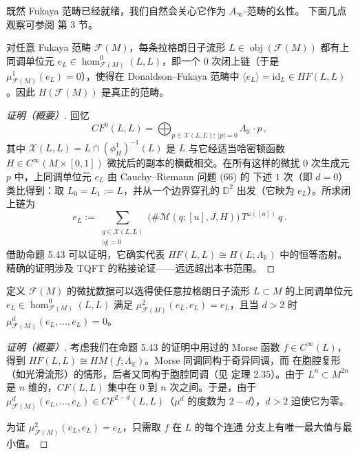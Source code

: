 
既然 Fukaya 范畴已经就绪，我们自然会关心它作为 $A_\infty$-范畴的幺性。
下面几点观察可参阅 \cite{AS09} 第 3 节。

\begin{Lem}\label{lem:6.16}
对任意 Fukaya 范畴 $\mathcal F(M)$，每条拉格朗日子流形
$L\in\operatorname{obj}(\mathcal F(M))$ 都有上同调单位元
$e_L\in\hom^0_{\mathcal F(M)}(L,L)$，即一个 $0$ 次闭上链（于是
$\mu^1_{\mathcal F(M)}(e_L)=0$），使得在 Donaldson--Fukaya 范畴中
$\langle e_L\rangle=\mathrm{id}_L\in HF(L,L)$。因此 $H(\mathcal F(M))$
是真正的范畴。
\end{Lem}

\begin{proof}[证明（概要）]
回忆
\[
CF^0(L,L)=\bigoplus_{p\in\mathcal X(L,L):\ |p|=0}\Lambda_{\mathbb K}\cdot p\,,
\]
其中 $\mathcal X(L,L)=L\cap(\phi^1_H)^{-1}(L)$ 是 $L$ 与它经适当哈密顿函数
$H\in C^\infty(M\times[0,1])$ 微扰后的副本的横截相交。在所有这样的微扰
$0$ 次生成元 $p$ 中，上同调单位元 $e_L$ 由 Cauchy--Riemann 问题 (66) 的
下述 $1$ 次（即 $d=0$）类比得到：取 $L_0=L_1:=L$，并从一个边界穿孔的
$\mathbb D^2$ 出发（它映为 $e_L$）。所求闭上链为
\begin{equation}
e_L:=\sum_{\substack{q\in\mathcal X(L,L)\\ |q|=0}}
\bigl(\#\mathcal M(q;[u],J,H)\bigr)\,T^{\omega([u])}\,q\,.
\label{eq:6.87}
\end{equation}
借助命题 5.43 可以证明，它确实代表 $HF(L,L)\cong H(L;\Lambda_{\mathbb K})$
中的恒等态射。精确的证明涉及 TQFT 的粘接论证——远远超出本书范围。
\end{proof}


\begin{Lem}\label{lem:6.17}
定义 $\mathcal F(M)$ 的微扰数据可以选得使任意拉格朗日子流形
$L\subset M$ 的上同调单位元 $e_L\in\hom^0_{\mathcal F(M)}(L,L)$ 满足
$\mu^2_{\mathcal F(M)}(e_L,e_L)=e_L$，且当 $d>2$ 时
$\mu^d_{\mathcal F(M)}(e_L,\dots,e_L)=0$。
\end{Lem}

\begin{proof}[证明（概要）]
考虑我们在命题 5.43 的证明中用过的 Morse 函数 $f\in C^\infty(L)$，得到
$HF(L,L)\cong HM(f;\Lambda_{\mathbb K})$。Morse 同调同构于奇异同调，而
在胞腔复形（如光滑流形）的情形，后者又同构于胞腔同调（见 \cite{Hat09}
定理 2.35）。由于 $L^n\subset M^{2n}$ 是 $n$ 维的，$CF(L,L)$
集中在 $0$ 到 $n$ 次之间。于是，由于
$\mu^d_{\mathcal F(M)}(e_L,\dots,e_L)\in CF^{2-d}(L,L)$（$\mu^d$
的度数为 $2-d$），$d>2$ 迫使它为零。

为证 $\mu^2_{\mathcal F(M)}(e_L,e_L)=e_L$，只需取 $f$ 在 $L$ 的每个连通
分支上有唯一最大值与最小值。
\end{proof}

